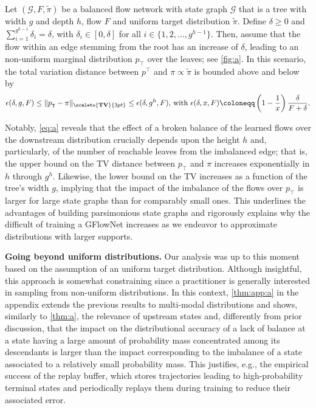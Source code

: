 \begin{example} \label{thm:a} 
    Let $(\mathcal{G}, F, \tilde{\pi})$ be a balanced flow network with state graph $\mathcal{G}$ that is a tree with width $g$ and depth $h$, flow $F$ and uniform target distribution $\tilde{\pi}$.  Define $\delta \ge 0$ and $\sum_{i=1}^{g^{h - 1}} \delta_{i} = \delta$, with $\delta_{i} \in [0, \delta]$ for all $i \in \{1, 2, \dots, g^{h - 1}\}$. Then, assume that the flow within an edge stemming from the root has an increase of $\delta$, leading to an non-uniform marginal distribution $p_{\intercal}$ over the leaves; see \autoref{fig:a}. In this scenario, the total variation distance between $p^{\intercal}$ and $\pi \propto \tilde{\pi}$ is bounded above and below by 
    \begin{equation}
    \label{eq:a} 
    \begin{aligned}
        \epsilon(\delta, g, F) \leq \|p_{\intercal} - \pi\|_{\scaleto{\textbf{TV}}{3pt}} \leq \epsilon(\delta, g^{h}, F), \, \text{with } 
        \epsilon(\delta, x, F) \coloneqq \left(1 - \frac{1}{x}\right) \frac{\delta}{F + \delta}.  
    \end{aligned}
    \end{equation} 
\end{example}

Notably, \autoref{eq:a} reveals that the effect of a broken balance of the learned flows over the downstream distribution crucially depends upon the height $h$ and, particularly, of the number of reachable leaves from the imbalanced edge; that is, the upper bound on the TV distance between $p_{\intercal}$ and $\pi$ increases exponentially in $h$ through $g^{h}$. Likewise, the lower bound on the TV increases as a function of the tree's width $g$, implying that the impact of the imbalance of the flows over $p_{\intercal}$ is larger for large state graphs than for comparably small ones. This underlines the advantages of building parsimonious state graphs and rigorously explains why the difficult of training a GFlowNet increases as we endeavor to approximate distributions with larger supports. 

\vspace{4pt}\noindent\textbf{Going beyond uniform distributions.} Our analysis was up to this moment based on the assumption of an uniform target distribution. Although insightful, this approach is somewhat constraining since a practitioner is generally interested in sampling from non-uniform distributions. In this context, \autoref{thm:app:a} in the appendix extends the previous results to multi-modal distributions and shows, similarly to \autoref{thm:a}, the relevance of upstream states and, differently from prior discussion, that the impact on the distributional accuracy of a lack of balance at a state having a large amount of probability mass concentrated among its descendants is larger than the impact corresponding to the imbalance of a state associated to a relatively small probability mass. This justifies, e.g., the empirical success of the replay buffer, which stores trajectories leading to high-probability terminal states and periodically replays them during training to reduce their associated error. 

